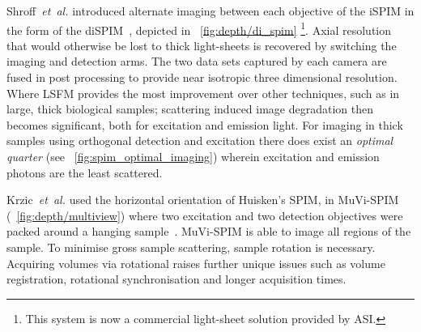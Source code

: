 Shroff~\emph{et~al.} introduced alternate imaging between each objective of the \gls{iSPIM} in the form of the \gls{diSPIM}~\cite{kumar_dual-view_2014}, depicted in \figurename~\ref{fig:depth/di_spim}%
\footnote{This system is now a commercial \gls{light-sheet} solution provided by ASI.}.
Axial resolution that would otherwise be lost to thick \gls{light-sheet}s is recovered by switching the imaging and detection arms.
The two data sets captured by each camera are fused in post processing to provide near isotropic three dimensional resolution.
Where \gls{LSFM} provides the most improvement over other techniques, such as in large, thick biological samples;
scattering induced image degradation then becomes significant, both for excitation and emission light.
For imaging in thick samples using orthogonal detection and excitation there does exist an
\emph{optimal quarter} (see \figurename~\ref{fig:spim_optimal_imaging}) wherein excitation and emission photons are the least scattered.

Krzic~\emph{et~al.} used the horizontal orientation of Huisken's \gls{SPIM}, in \gls{MuVi-SPIM} (\figurename~\ref{fig:depth/multiview}) where two excitation and two detection objectives were packed around a hanging sample~\cite{krzicMultiviewLightsheetMicroscope2012}.
\gls{MuVi-SPIM} is able to image all regions of the sample. %
To minimise gross sample scattering, sample rotation is necessary.
Acquiring volumes via rotational  raises further unique issues such as volume registration, rotational synchronisation and longer acquisition times.

